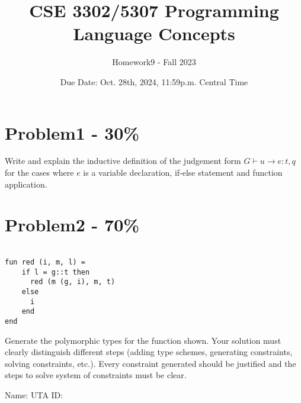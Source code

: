 \documentclass{article}
\newcommand{\answerboxbig}{
    \vspace{20cm} %
}
\newcommand{\studentinfo}{
    \noindent Name: \underline{\hspace{5cm}} UTA ID: \underline{\hspace{5cm}}\\
    \vspace{0.5cm} %
}
\begin{document}
\title{CSE 3302/5307 Programming Language Concepts}
\author{Homework9 - Fall 2023}
\date{Due Date: Oct. 28th, 2024, 11:59p.m. Central Time}
\maketitle
\thispagestyle{fancy}


\section*{Problem1 - 30\%}

Write and explain the inductive definition of the judgement form $G \vdash u \xrightarrow{} e : t, q$ for the cases where $e$ is a variable declaration, if-else statement and function application.



\answerboxbig

\section*{Problem2 - 70\%}

\begin{lstlisting}

fun red (i, m, l) = 
    if l = g::t then 
      red (m (g, i), m, t)
    else 
      i
    end
end
\end{lstlisting}


\noindent
Generate the polymorphic types for the function shown. Your solution must clearly distinguish different steps (adding type schemes, generating constraints, solving constraints, etc.). Every constraint generated should be justified and the steps to solve system of constraints must be clear.

\answerboxbig

\newpage 
\mbox{}
\newpage 




\studentinfo
\end{document}
